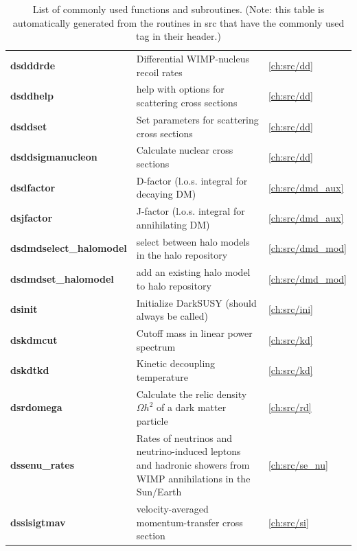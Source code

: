 \documentclass[a4paper,10pt,oneside]{book}
\newcommand{\code}[1]{\ft{#1}}
\newcommand{\ft}[1]{\textsf{#1}}
\newcommand{\ftb}[1]{{\bfseries \sffamily #1}}
\begin{document}
\begin{table}[!h]
\begin{tabular}{lp{8.5cm}l}
\ftb{dsdddrde} \index[routines]{dsdddrde} &  Differential WIMP-nucleus recoil rates & \ref{ch:src/dd} \\
\ftb{dsddhelp} \index[routines]{dsddhelp} &  help with options for scattering cross sections & \ref{ch:src/dd} \\
\ftb{dsddset} \index[routines]{dsddset} &  Set parameters for scattering cross sections & \ref{ch:src/dd} \\
\ftb{dsddsigmanucleon} \index[routines]{dsddsigmanucleon} &  Calculate nuclear cross sections & \ref{ch:src/dd} \\
\ftb{dsdfactor} \index[routines]{dsdfactor} &  D-factor (l.o.s. integral for decaying DM) & \ref{ch:src/dmd_aux} \\
\ftb{dsjfactor} \index[routines]{dsjfactor} &  J-factor (l.o.s. integral for annihilating DM) & \ref{ch:src/dmd_aux} \\
\ftb{dsdmdselect\_halomodel} \index[routines]{dsdmdselect\_halomodel} &  select between halo models in the halo repository & \ref{ch:src/dmd_mod} \\
\ftb{dsdmdset\_halomodel} \index[routines]{dsdmdset\_halomodel} &  add an existing halo model to halo repository & \ref{ch:src/dmd_mod} \\
\ftb{dsinit} \index[routines]{dsinit} &  Initialize DarkSUSY (should always be called) & \ref{ch:src/ini} \\
\ftb{dskdmcut} \index[routines]{dskdmcut} &  Cutoff mass in linear power spectrum & \ref{ch:src/kd} \\
\ftb{dskdtkd} \index[routines]{dskdtkd} &  Kinetic decoupling temperature & \ref{ch:src/kd} \\
\ftb{dsrdomega} \index[routines]{dsrdomega} &  Calculate the relic density $\Omega h^2$ of a dark matter particle & \ref{ch:src/rd} \\
\ftb{dssenu\_rates} \index[routines]{dssenu\_rates} &  Rates of neutrinos and neutrino-induced leptons and hadronic showers from WIMP annihilations in the Sun/Earth & \ref{ch:src/se_nu} \\
\ftb{dssisigtmav} \index[routines]{dssisigtmav} &  velocity-averaged momentum-transfer cross section & \ref{ch:src/si} \\
\hline
\end{tabular}
\caption{List of commonly used functions and subroutines. (Note: this table is automatically generated from the routines in \code{src} that have the commonly used tag in their header.)}
\label{tab:culist}
\end{table}
\end{document}
